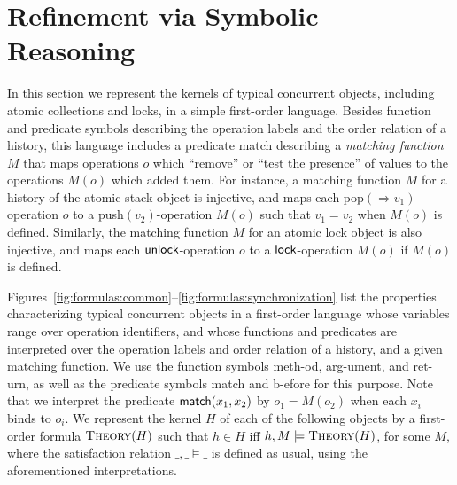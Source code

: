 
\section{Refinement via Symbolic Reasoning}
\label{sec:logic}

In this section we represent the kernels of typical concurrent objects,
including atomic collections and locks, in a simple first-order language. 
Besides function and predicate symbols describing the operation labels and 
the order relation of a history, this language includes
a predicate {\sf match} describing a \emph{matching function} $M$ that
maps
operations $o$ which ``remove'' or ``test the presence'' of values to the operations $M(o)$ which added
them. For instance, a matching function $M$ for a history of the atomic
stack object is injective, and maps each pop$(\Rightarrow v_1)$-operation $o$ to a
push$(v_2)$-operation $M(o)$ such that $v_1 = v_2$ when $M(o)$ is
defined. Similarly, the matching function $M$ for an atomic lock object is
also injective, and maps each ${\sf unlock}$-operation $o$ to a
${\sf lock}$-operation $M(o)$ if $M(o)$ is defined. 

Figures~\ref{fig:formulas:common}--\ref{fig:formulas:synchronization} list the
properties characterizing typical concurrent objects in a first-order language
whose variables range over operation identifiers, and whose functions and
predicates are interpreted over the operation labels and order relation of a
history, and a given matching function. We use the function symbols
{\sf meth}-od, {\sf arg}-ument, and {\sf ret}-urn, as well as the predicate
symbols {\sf match} and {\sf b}-efore for this purpose. Note that we interpret
the predicate ${\sf match}(x_1,x_2)$ by $o_1 = M(o_2)$ when each $x_i$ binds
to $o_i$. We represent the kernel $H$ of each of the following objects by a
first-order formula $\textsc{Theory}(H)$ such that $h \in H$ if{f} $h, M \models \textsc{Theory}(H)$, 
for some $M$, where
the satisfaction relation $\_, \_ \models \_$ is defined as usual, using the
aforementioned interpretations.

